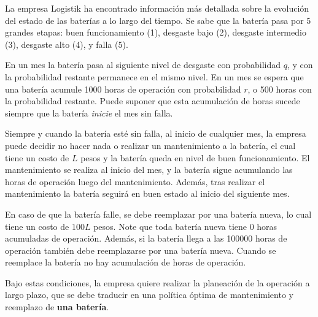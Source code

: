  \noindent La empresa Logistik ha encontrado información más detallada sobre la evolución del estado de las baterías a lo largo del tiempo. 
Se sabe que la batería pasa por 5 grandes etapas: buen funcionamiento (1), desgaste bajo (2), desgaste intermedio (3), desgaste alto (4), y falla (5). 

\noindent En un mes la batería pasa al siguiente nivel de desgaste con probabilidad $q$, y con la probabilidad restante permanece en el mismo nivel. 
\noindent En un mes se espera que una batería acumule 1000 horas de operación con probabilidad $r$, o 500 horas con la probabilidad restante. 
Puede suponer que esta acumulación de horas sucede siempre que la batería \emph{inicie} el mes sin falla. 

\noindent Siempre y cuando la batería esté sin falla, al inicio de cualquier mes, la empresa puede decidir no hacer nada o realizar un mantenimiento a la batería, el cual tiene un costo de $L$ pesos y la batería queda en nivel de buen funcionamiento. 
El mantenimiento se realiza al inicio del mes, y la batería sigue acumulando las horas de operación luego del mantenimiento. Además, tras realizar el mantenimiento la batería seguirá en buen estado al inicio del siguiente mes. 


\noindent En caso de que la batería falle, se debe reemplazar por una batería nueva, lo cual tiene un costo de $100L$ pesos. Note que toda batería nueva tiene 0 horas acumuladas de operación. Además, si la batería llega a las 100000 horas de operación también debe reemplazarse por una batería nueva. Cuando se reemplace la batería no hay acumulación de horas de operación. 

\noindent Bajo estas condiciones, la empresa quiere realizar la planeación de la operación a largo plazo, que se debe traducir en una política óptima de mantenimiento y reemplazo de \textbf{una batería}. 


